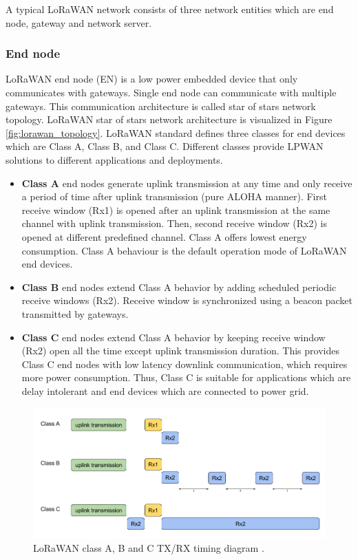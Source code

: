 A typical LoRaWAN network consists of three network entities which are end node, gateway and network server.

\subsubsection{End node}

LoRaWAN end node (EN) is a low power embedded device that only communicates with gateways. Single end node can communicate with multiple gateways. This communication architecture is called star of stars network topology. LoRaWAN star of stars network architecture is visualized in Figure \ref{fig:lorawan_topology}. LoRaWAN standard defines three classes for end devices which are Class A, Class B, and Class C. Different classes provide LPWAN solutions to different applications and deployments.

\begin{itemize}
  \item \textbf{Class A} end nodes generate uplink transmission at any time and only receive a period of time after uplink transmission (pure ALOHA manner). First receive window (Rx1) is opened after an uplink transmission at the same channel with uplink transmission. Then, second receive window (Rx2) is opened at different predefined channel. Class A offers lowest energy consumption. Class A behaviour is the default operation mode of LoRaWAN end devices.
  \item \textbf{Class B} end nodes extend Class A behavior by adding scheduled periodic receive windows (Rx2). Receive window is synchronized using a beacon packet transmitted by gateways.
  \item \textbf{Class C} end nodes extend Class A behavior by keeping receive window (Rx2) open all the time except uplink transmission duration. This provides Class C end nodes with low latency downlink communication, which requires more power consumption. Thus, Class C is suitable for applications which are delay intolerant and end devices which are connected to power grid.
\end{itemize}

\begin{figure}
\centering
\includegraphics[width=\linewidth]{fig/lorawan_class.png}
\vspace*{4mm}
\caption{LoRaWAN class A, B and C TX/RX timing diagram \cite{witekio}.}
\label{fig:lorawan_class}
\end{figure}

